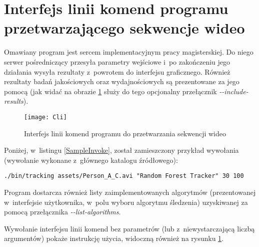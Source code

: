   \section{Interfejs linii komend programu przetwarzającego sekwencje wideo}\label{Section_CLI}
    Omawiany program jest sercem implementacyjnym pracy magisterskiej. Do niego serwer pośredniczący przesyła parametry wejściowe i~po zakończeniu jego działania wysyła rezultaty z~powrotem do interfejsu graficznego. Również rezultaty badań jakościowych oraz wydajnościowych są prezentowane za jego pomocą (jak widać na obrazie \ref{fig:Cli} służy do tego opcjonalny przełącznik \textit{-{}-include-results}).

    \newpage
    \begin{figure}[!ht]
      \centering
      \texttt{[image: Cli]}
      \caption[Interfejs linii komend programu do przetwarzania sekwencji wideo]{Interfejs linii komend programu do przetwarzania sekwencji wideo}
      \label{fig:Cli}
    \end{figure}

    Poniżej, w~listingu \ref{SampleInvoke}, został zamieszczony przykład wywołania (wywołanie wykonane z~głównego katalogu źródłowego):
      \begin{sample}[ht]
        \begin{verbatim}
./bin/tracking assets/Person_A_C.avi "Random Forest Tracker" 30 100
        \end{verbatim}
        \caption{Przykładowe wywołanie interfejsu konsolowego}
        \label{SampleInvoke}
      \end{sample}

    Program dostarcza również listy zaimplementowanych algorytmów (prezentowanej w~interfejsie użytkownika, w~polu wyboru algorytmu śledzenia) uzyskiwanej za pomocą przełącznika \textit{-{}-list-algorithms}.

    Wywołanie interfejsu linii komend bez parametrów (lub z~niewystarczającą liczbą argumentów) pokaże instrukcję użycia, widoczną również na rysunku \ref{fig:Cli}.